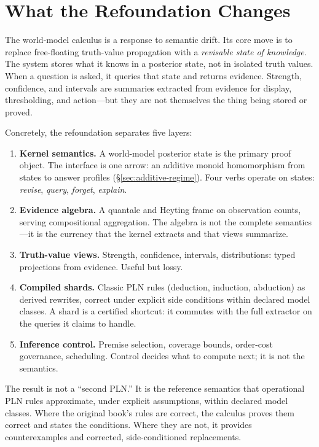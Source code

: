 \documentclass[11pt,openany]{report}
\begin{document}
\section{What the Refoundation Changes}

The world-model calculus is a response to semantic drift.  Its core
move is to replace free-floating truth-value propagation with a
\emph{revisable state of knowledge}.  The system stores what it knows
in a posterior state, not in isolated truth values.  When a question is
asked, it queries that state and returns evidence.  Strength,
confidence, and intervals are summaries extracted from evidence for
display, thresholding, and action---but they are not themselves the
thing being stored or proved.

Concretely, the refoundation separates five layers:

\begin{enumerate}
\item \textbf{Kernel semantics.}  A world-model posterior state is the
  primary proof object.  The interface is one arrow: an additive monoid
  homomorphism from states to answer profiles
  (\S\ref{sec:additive-regime}).  Four verbs operate on states:
  \emph{revise}, \emph{query}, \emph{forget}, \emph{explain}.

\item \textbf{Evidence algebra.}  A quantale and Heyting frame on
  observation counts, serving compositional aggregation.  The algebra
  is not the complete semantics---it is the currency that the kernel
  extracts and that views summarize.

\item \textbf{Truth-value views.}  Strength, confidence, intervals,
  distributions: typed projections from evidence.  Useful but lossy.

\item \textbf{Compiled shards.}  Classic PLN rules (deduction,
  induction, abduction) as derived rewrites, correct under explicit
  side conditions within declared model classes.  A shard is a
  certified shortcut: it commutes with the full extractor on the
  queries it claims to handle.

\item \textbf{Inference control.}  Premise selection, coverage bounds,
  order-cost governance, scheduling.  Control decides what to compute
  next; it is not the semantics.
\end{enumerate}

\noindent
The result is not a ``second PLN.''  It is the reference semantics that
operational PLN rules approximate, under explicit assumptions, within
declared model classes.  Where the original book's rules are correct,
the calculus proves them correct and states the conditions.  Where they
are not, it provides counterexamples and corrected, side-conditioned
replacements.
\end{document}
